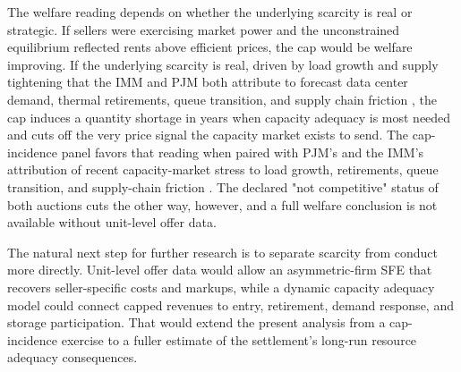 The welfare reading depends on whether the underlying scarcity is
real or strategic. If sellers were exercising market power and the
unconstrained equilibrium reflected rents above efficient
prices, the cap would be welfare improving. If the underlying
scarcity is real, driven by load growth and supply tightening that
the IMM and PJM both attribute to forecast data center demand,
thermal retirements, queue transition, and supply chain friction
\citep{MonitoringAnalytics2025_sotm, PJM2026_shortfall_report}, the
cap induces a quantity shortage in years when capacity adequacy is
most needed and cuts off the very price signal the capacity market
exists to send.
The cap-incidence panel favors
that reading when paired with PJM's and the IMM's attribution of
recent capacity-market stress to load growth, retirements, queue
transition, and supply-chain friction
\citep{MonitoringAnalytics2025_sotm, PJM2026_shortfall_report}. The
declared "not competitive" status of both auctions cuts the other
way, however, and a full welfare conclusion is not available without
unit-level offer data.

The natural next step for further research is to separate scarcity from conduct more directly. Unit-level offer data would allow an asymmetric-firm SFE that recovers seller-specific costs and markups, while a dynamic capacity adequacy model could connect capped revenues to entry, retirement, demand response, and storage participation. That would extend the present analysis from a cap-incidence exercise to a fuller estimate of the settlement’s long-run resource adequacy consequences.
